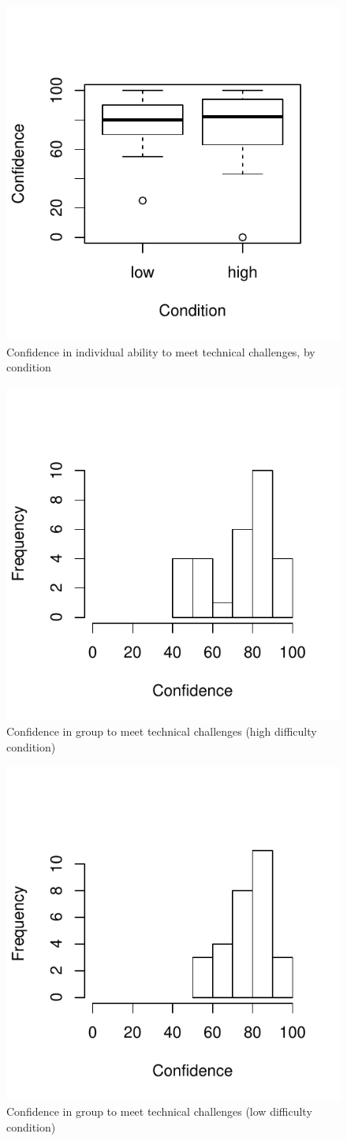 \begin{figure}
  \centering
   \includegraphics[width=0.5\linewidth,keepaspectratio] {images/indConfChallengesBoxplot-1}
  \caption{Confidence in individual ability to meet technical challenges, by condition}
  \label{fig:indConfChallengesBoxplot}
\end{figure}


\begin{figure}
  \centering
  \includegraphics[width=0.5\linewidth,keepaspectratio] {images/histHighGroupConfidence-1}
  \caption{Confidence in group to meet technical challenges (high difficulty condition)}
  \label{fig:groupConfChallengesBoxplot}
\end{figure}

\begin{figure}
  \centering
  \includegraphics[width=0.5\linewidth,keepaspectratio] {images/histLowGroupConfidence-1}
  \caption{Confidence in group to meet technical challenges (low difficulty condition)}
  \label{fig:histLowGroupConfidence}
\end{figure}

